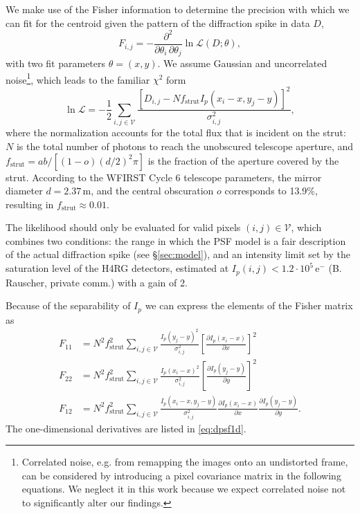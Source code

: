 \documentclass[modern, times]{aastex61}
\begin{document}
We make use of the Fisher information to determine the precision with which we can fit for the centroid given the pattern of the diffraction spike in data $D$,
\begin{equation}
F_{i,j} = -\frac{\partial^2}{\partial\theta_i \, \partial\theta_j} \ln \mathcal{L}(D;\theta)\mathrm{,}
\end{equation}
with two fit parameters $\theta=(x,y)$.
We assume Gaussian and uncorrelated noise\footnote{Correlated noise, e.g. from remapping the images onto an undistorted frame, can be considered by introducing a pixel covariance matrix in the following equations. We neglect it in this work because we expect correlated noise not to significantly alter our findings.}, which leads to the familiar $\chi^2$ form
\begin{equation}
\label{eq:lnL}
\ln \mathcal{L} = -\frac{1}{2}\sum_{i,j\in\mathcal{V}}\frac{\left[D_{i,j} - N f_\mathrm{strut} I_p(x_i - x, y_j - y)\right]^2}{\sigma_{i,j}^2},
\end{equation}
where the normalization accounts for the total flux that is incident on the strut: $N$ is the total number of photons to reach the unobscured telescope aperture, and $f_\mathrm{strut}=ab\big/[(1-o)(d/2)^2\pi]$ is the fraction of the aperture covered by the strut. 
According to the WFIRST Cycle 6 telescope parameters, the mirror diameter $d=2.37$\,m, and the central obscuration $o$ corresponds to 13.9\%, resulting in $f_\mathrm{strut}\approx 0.01$.

The likelihood should only be evaluated for valid pixels $(i,j)\in\mathcal{V}$, which combines two conditions: the range in which the PSF model is a fair description of the actual diffraction spike (see \S\ref{sec:model}), and an intensity limit set by the saturation level of the H4RG detectors, estimated at $I_p(i,j)<1.2\cdot10^5\,\mathrm{e}^-$ (B. Rauscher, private comm.) with a gain of 2.

Because of the separability of $I_p$ we can express the elements of the Fisher matrix as
\begin{equation}
\label{eq:Fisher}
\begin{split}
F_{11} &= N^2 f^2_\mathrm{strut} \sum_{i,j\in\mathcal{V}} \frac{I_p(y_j-y)^2}{\sigma_{i,j}^2}\left[\frac{\partial I_p(x_i - x)}{\partial x}\right]^2\\
F_{22} &= N^2 f^2_\mathrm{strut}\sum_{i,j\in\mathcal{V}} \frac{I_p(x_i-x)^2}{\sigma_{i,j}^2}\left[\frac{\partial I_p(y_j - y)}{\partial y}\right]^2\\
F_{12} &= N^2 f^2_\mathrm{strut}\sum_{i,j\in\mathcal{V}} \frac{I_p(x_i-x, y_j-y)}{\sigma_{i,j}^2} \frac{\partial I_p(x_i - x)}{\partial x} \frac{\partial I_p(y_j - y)}{\partial y}.
\end{split}
\end{equation}
The one-dimensional derivatives are listed in \autoref{eq:dpsf1d}. 
\end{document}
